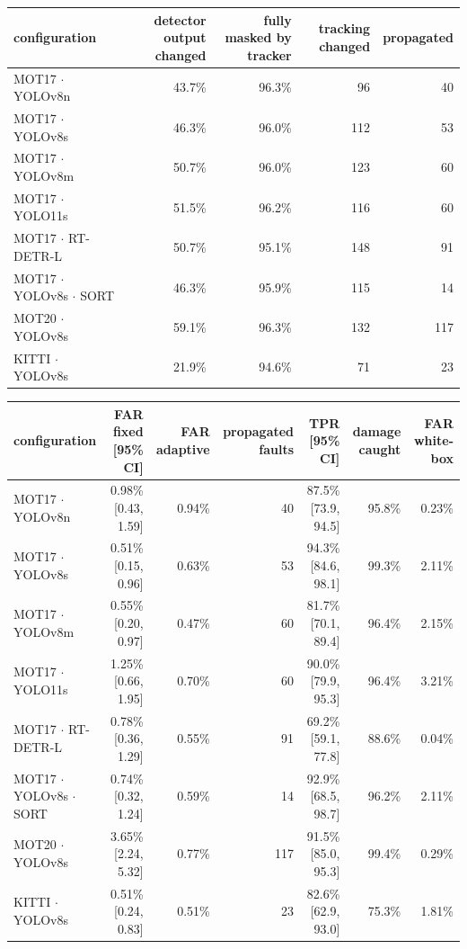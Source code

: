\begin{tabular}{lrrrr}
\toprule
configuration & detector output changed & fully masked by tracker & tracking changed & propagated \\
\midrule
MOT17 $\cdot$ YOLOv8n & 43.7\% & 96.3\% & 96 & 40 \\
MOT17 $\cdot$ YOLOv8s & 46.3\% & 96.0\% & 112 & 53 \\
MOT17 $\cdot$ YOLOv8m & 50.7\% & 96.0\% & 123 & 60 \\
MOT17 $\cdot$ YOLO11s & 51.5\% & 96.2\% & 116 & 60 \\
MOT17 $\cdot$ RT-DETR-L & 50.7\% & 95.1\% & 148 & 91 \\
MOT17 $\cdot$ YOLOv8s $\cdot$ SORT & 46.3\% & 95.9\% & 115 & 14 \\
MOT20 $\cdot$ YOLOv8s & 59.1\% & 96.3\% & 132 & 117 \\
KITTI $\cdot$ YOLOv8s & 21.9\% & 94.6\% & 71 & 23 \\
\bottomrule
\end{tabular}

\begin{tabular}{lrrrrrr}
\toprule
configuration & FAR fixed [95\% CI] & FAR adaptive & propagated faults & TPR [95\% CI] & damage caught & FAR white-box \\
\midrule
MOT17 $\cdot$ YOLOv8n & 0.98\% [0.43, 1.59] & 0.94\% & 40 & 87.5\% [73.9, 94.5] & 95.8\% & 0.23\% \\
MOT17 $\cdot$ YOLOv8s & 0.51\% [0.15, 0.96] & 0.63\% & 53 & 94.3\% [84.6, 98.1] & 99.3\% & 2.11\% \\
MOT17 $\cdot$ YOLOv8m & 0.55\% [0.20, 0.97] & 0.47\% & 60 & 81.7\% [70.1, 89.4] & 96.4\% & 2.15\% \\
MOT17 $\cdot$ YOLO11s & 1.25\% [0.66, 1.95] & 0.70\% & 60 & 90.0\% [79.9, 95.3] & 96.4\% & 3.21\% \\
MOT17 $\cdot$ RT-DETR-L & 0.78\% [0.36, 1.29] & 0.55\% & 91 & 69.2\% [59.1, 77.8] & 88.6\% & 0.04\% \\
MOT17 $\cdot$ YOLOv8s $\cdot$ SORT & 0.74\% [0.32, 1.24] & 0.59\% & 14 & 92.9\% [68.5, 98.7] & 96.2\% & 2.11\% \\
MOT20 $\cdot$ YOLOv8s & 3.65\% [2.24, 5.32] & 0.77\% & 117 & 91.5\% [85.0, 95.3] & 99.4\% & 0.29\% \\
KITTI $\cdot$ YOLOv8s & 0.51\% [0.24, 0.83] & 0.51\% & 23 & 82.6\% [62.9, 93.0] & 75.3\% & 1.81\% \\
\bottomrule
\end{tabular}


